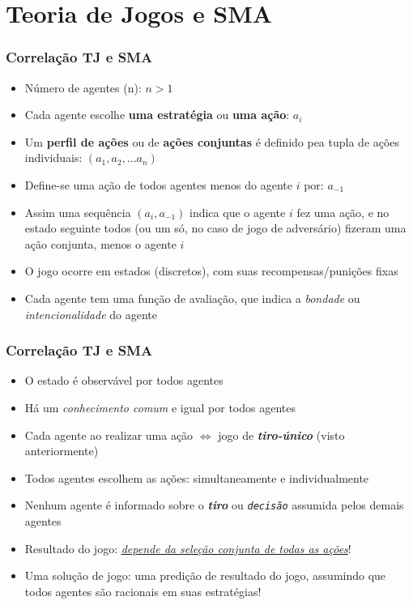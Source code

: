 \section{Teoria de Jogos e SMA}


\begin{frame}
\frametitle{Correlação TJ e SMA}

\begin{itemize}
  \item Número de agentes (n): $n > 1$
  \item Cada agente escolhe \textbf{uma estratégia} ou \textbf{uma ação}: $a_i$
  \item Um \textbf{perfil de ações} ou  de \textbf{ações conjuntas} é definido pea tupla de ações individuais: $(a_1, a_2, ...a_n)$
  
     \item Define-se uma ação de todos agentes menos do agente $i$ por: $a_{-1}$
  
  \item Assim uma sequência $(a_i,a_{-1})$ indica que o agente $i$ fez uma ação, e no estado seguinte
  todos  (ou um só, no caso de jogo de adversário) fizeram uma ação conjunta, menos o agente $i$
  
  \item O jogo ocorre em estados  (discretos), com suas recompensas/punições fixas
  
  \item Cada agente tem uma função de avaliação, que indica a \textit{bondade}   ou \textit{intencionalidade} do agente
\end{itemize}

\end{frame}




\begin{frame}
\frametitle{Correlação TJ e SMA}

\begin{itemize}
  \item O estado é observável por todos agentes
  \item Há um \textit{conhecimento comum} e igual por todos agentes
  \item Cada agente ao realizar uma ação $\Leftrightarrow $ jogo de \textbf{\textit{tiro-único}} (visto anteriormente)
  \item Todos agentes escolhem as ações: simultaneamente e individualmente
  \item Nenhum agente é informado sobre o \textbf{{\em tiro}} ou \texttt{\textit{decisão}} assumida pelos demais agentes
  \item Resultado do jogo: \textit{\underline{depende da seleção conjunta de todas as ações}}!
  \item Uma solução de jogo: uma predição de resultado do jogo, assumindo que todos agentes
  são racionais em suas estratégias!
\end{itemize}

\end{frame}



